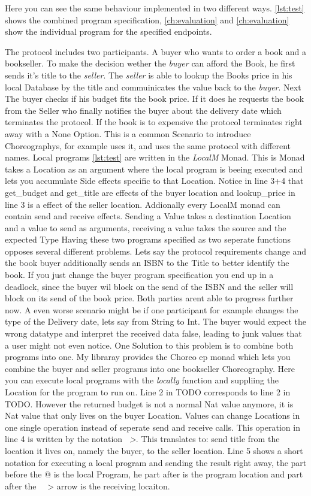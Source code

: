 Here you can see the same behaviour implemented in two different ways. \cref{lst:test} shows the combined program specification, \cref{ch:evaluation} and \cref{ch:evaluation} show the individual program for the specified endpoints.
\par
The protocol includes two participants. A buyer who wants to order a book and a bookseller. To make the decision wether the \emph{buyer} can afford the Book, he first sends it's title to the \emph{seller}. The \emph{seller} is able to lookup the Books price in his local Database by the title and commuinicates the value back to the \emph{buyer}. Next The buyer checks if his budget fits the book price. If it does he requests the book from the Seller who finally notifies the buyer about the delivery date which terminates the protocol. If the book is to expensive the protocol terminates right away with a None Option.
This is a common Scenario to introduce Choreographys, for example \cite{pirouette} uses it, and \cite{gentle-introduction-multiparty-sessiontypes} uses the same protocol with different names.
Local programs \cref{lst:test} are written in the \emph{LocalM} Monad. This is Monad takes a Location as an argument where the local program is beeing executed and lets you accumulate Side effects specific to that Location. Notice in line 3+4 %
that get_budget and get_title are effects of the buyer location and lookup_price in line 3 is a effect of the seller location. Addionally every LocalM monad can contain send and receive effects. Sending a Value takes a destination Location and a value to send as arguments, receiving a value takes the source and the expected Type %
Having these two programs specified as two seperate functions opposes several different problems. Lets say the protocol requirements change and the book buyer additionally sends an ISBN to the Title to better identify the book. If you just change the buyer program specification you end up in a deadlock, since the buyer wil block on the send of the ISBN and the seller will block on its send of the book price. Both parties arent able to progress further now. A even worse scenario might be if one participant for example changes the type of the Delivery date, lets say from String to Int. The buyer would expect the wrong datatype and interpret the received data false, leading to junk values that a user might not even notice.
One Solution to this problem is to combine both programs into one. My libraray provides the Choreo ep monad which lets you combine the buyer and seller programs into one bookseller Choreography. Here you can execute local programs with the \emph{locally} function and suppliing the Location for the program to run on. Line 2 in TODO corresponds to line 2 in TODO. However the returned budget is not a normal Nat value anymore, it is Nat value that only lives on the buyer Location.%
Values can change Locations in one single operation instead of seperate send and receive calls. This operation in line 4 is written by the notation \emph{~>}. This translates to: send title from the location it lives on, namely the buyer, to the seller location. Line 5 shows a short notation for executing a local program and sending the result right away, the part before the @ is the local Program, he part after is the program location and part after the ~~> arrow is the receiving locaiton.
